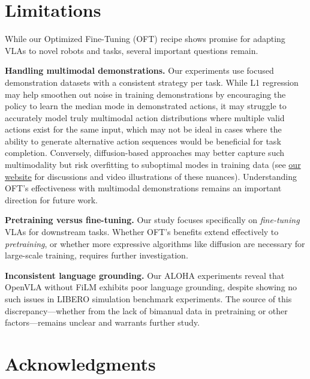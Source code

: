 \documentclass[conference]{IEEEtran}
\begin{document}
\section{Limitations}
\label{sec:Limitations}

While our Optimized Fine-Tuning (OFT) recipe shows promise for adapting VLAs to novel robots and tasks, several important questions remain.

\textbf{Handling multimodal demonstrations.} Our experiments use focused demonstration datasets with a consistent strategy per task. While L1 regression may help smoothen out noise in training demonstrations by encouraging the policy to learn the median mode in demonstrated actions, it may struggle to accurately model truly multimodal action distributions where multiple valid actions exist for the same input, which may not be ideal in cases where the ability to generate alternative action sequences would be beneficial for task completion. Conversely, diffusion-based approaches may better capture such multimodality but risk overfitting to suboptimal modes in training data (see \href{https://openvla-oft.github.io/#l1-regression-vs-diffusion}{our website} for discussions and video illustrations of these nuances). Understanding OFT's effectiveness with multimodal demonstrations remains an important direction for future work.

\textbf{Pretraining versus fine-tuning.} Our study focuses specifically on \emph{fine-tuning} VLAs for downstream tasks. Whether OFT's benefits extend effectively to \emph{pretraining}, or whether more expressive algorithms like diffusion are necessary for large-scale training, requires further investigation.

\textbf{Inconsistent language grounding.} Our ALOHA experiments reveal that OpenVLA without FiLM exhibits poor language grounding, despite showing no such issues in LIBERO simulation benchmark experiments. The source of this discrepancy---whether from the lack of bimanual data in pretraining or other factors---remains unclear and warrants further study.







\section*{Acknowledgments}
\end{document}
